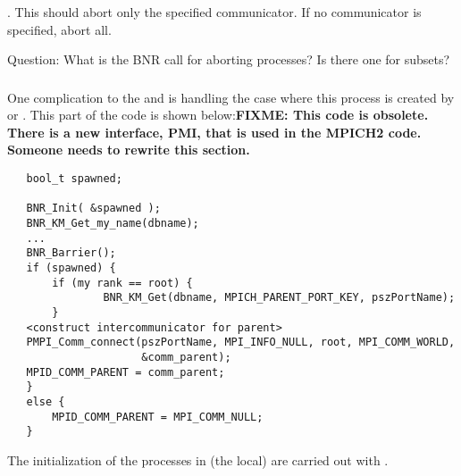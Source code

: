 \documentclass{article}
\def\fixme#1{\marginpar{FIXME:}\textbf{FIXME: #1}}
\begin{document}
\subsubsection{}
.  This should abort only the specified communicator.  If
no communicator is specified, abort all.  

Question: What is the BNR call for aborting processes?  Is there one for
subsets?  

\subsubsection{}

One complication to the  and  is
handling the case where this process is created by  or
.  This part of the code is shown
below:\fixme{This code is obsolete.  There is a new interface, PMI,
  that is used in the MPICH2 code.  Someone needs to rewrite this section.}

\begin{verbatim}
   bool_t spawned;

   BNR_Init( &spawned );
   BNR_KM_Get_my_name(dbname);
   ...
   BNR_Barrier();
   if (spawned) {
       if (my rank == root) {
               BNR_KM_Get(dbname, MPICH_PARENT_PORT_KEY, pszPortName);
       }
   <construct intercommunicator for parent>
   PMPI_Comm_connect(pszPortName, MPI_INFO_NULL, root, MPI_COMM_WORLD, 
                     &comm_parent);
   MPID_COMM_PARENT = comm_parent;
   }
   else {
       MPID_COMM_PARENT = MPI_COMM_NULL;
   }
\end{verbatim}

The initialization of the processes in (the local) 
are carried out with .
\end{document}
